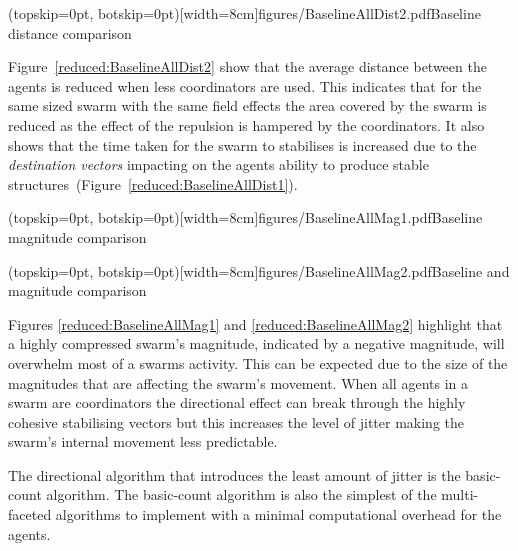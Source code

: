 \documentclass{ieeeaccess}
\begin{document}
\Figure[t!](topskip=0pt, botskip=0pt)[width=8cm]{figures/BaselineAllDist2.pdf}{Baseline distance comparison\label{reduced:BaselineAllDist2}}

Figure~\ref{reduced:BaselineAllDist2} show that the average distance between the agents is reduced when less coordinators are used. This indicates that for the same sized swarm with the same field effects the area covered by the swarm is reduced as the effect of the repulsion is hampered by the coordinators. It also shows that the time taken for the swarm to stabilises is increased due to the \textit{destination vectors} impacting on the agents ability to produce stable structures~(Figure~\ref{reduced:BaselineAllDist1}). 


\Figure[t!](topskip=0pt, botskip=0pt)[width=8cm]{figures/BaselineAllMag1.pdf}{Baseline magnitude comparison\label{reduced:BaselineAllMag1}}


\Figure[t!](topskip=0pt, botskip=0pt)[width=8cm]{figures/BaselineAllMag2.pdf}{Baseline and magnitude comparison\label{reduced:BaselineAllMag2}}

Figures \ref{reduced:BaselineAllMag1} and \ref{reduced:BaselineAllMag2} highlight that a highly compressed swarm's magnitude, indicated by a negative magnitude, will overwhelm most of a swarms activity. This can be expected due to the size of the magnitudes that are affecting the swarm's movement. When all agents in a swarm are coordinators the directional effect can break through the highly cohesive stabilising vectors but this increases the level of jitter making the swarm's internal movement less predictable.

The directional algorithm that introduces the least amount of jitter is the basic-count algorithm. The basic-count algorithm is also the simplest of the multi-faceted algorithms to implement with a minimal computational overhead for the agents. 
\end{document}
